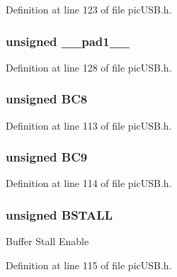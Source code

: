 Definition at line 123 of file pic\-U\-S\-B.\-h.

\hypertarget{union_b_d_stat_acaf2d0924a107ec6e8d2e31febaf66f9}{
\subsubsection[{\-\_\-\-\_\-pad1\-\_\-\-\_\-}]{\setlength{\rightskip}{0pt plus 5cm}unsigned \-\_\-\-\_\-pad1\-\_\-\-\_\-}}\label{union_b_d_stat_acaf2d0924a107ec6e8d2e31febaf66f9}


Definition at line 128 of file pic\-U\-S\-B.\-h.

\hypertarget{union_b_d_stat_a5d5010d284e6c86702a4ce3063f4cca5}{
\subsubsection[{B\-C8}]{\setlength{\rightskip}{0pt plus 5cm}unsigned B\-C8}}\label{union_b_d_stat_a5d5010d284e6c86702a4ce3063f4cca5}


Definition at line 113 of file pic\-U\-S\-B.\-h.

\hypertarget{union_b_d_stat_af499c0fe1fd8eba827eb024bf69841e9}{
\subsubsection[{B\-C9}]{\setlength{\rightskip}{0pt plus 5cm}unsigned B\-C9}}\label{union_b_d_stat_af499c0fe1fd8eba827eb024bf69841e9}


Definition at line 114 of file pic\-U\-S\-B.\-h.

\hypertarget{union_b_d_stat_a145ee75f12c62d2a89097d18477019f2}{
\subsubsection[{B\-S\-T\-A\-L\-L}]{\setlength{\rightskip}{0pt plus 5cm}unsigned B\-S\-T\-A\-L\-L}}\label{union_b_d_stat_a145ee75f12c62d2a89097d18477019f2}
Buffer Stall Enable 

Definition at line 115 of file pic\-U\-S\-B.\-h.

